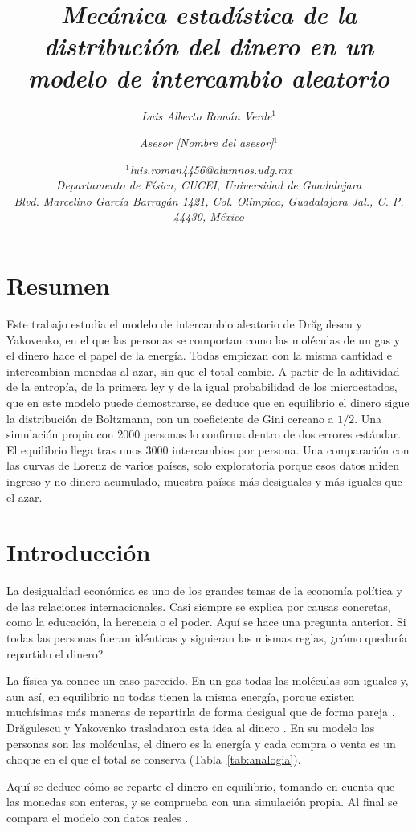 \documentclass[letterpaper,12pt]{article}
\title{\fontsize{0.5cm}{0.5cm}\selectfont
\textit{\textbf{Mecánica estadística de la distribución del dinero en un modelo de intercambio aleatorio}}
}
\author{ \fontsize{0.35cm}{0.5cm}\selectfont
\textit{Luis Alberto Román Verde$^1$} \\
        \and \fontsize{0.35cm}{0.5cm}\selectfont \textit{Asesor [Nombre del asesor]$^1$}
	}
\date{\small
  $^1$\fontsize{0.35cm}{0.5cm}\selectfont \textit{luis.roman4456@alumnos.udg.mx\\ Departamento de Física, CUCEI, Universidad de Guadalajara\\
    Blvd. Marcelino García Barragán 1421, Col. Olímpica, Guadalajara Jal., C. P. 44430, México}\\[2ex]
  }
\begin{document}
\maketitle
\thispagestyle{fancy}

\section*{Resumen}
Este trabajo estudia el modelo de intercambio aleatorio de Drăgulescu y Yakovenko, en el que las personas se comportan como las moléculas de un gas y el dinero hace el papel de la energía. Todas empiezan con la misma cantidad e intercambian monedas al azar, sin que el total cambie. A partir de la aditividad de la entropía, de la primera ley y de la igual probabilidad de los microestados, que en este modelo puede demostrarse, se deduce que en equilibrio el dinero sigue la distribución de Boltzmann, con un coeficiente de Gini cercano a $1/2$. Una simulación propia con 2000 personas lo confirma dentro de dos errores estándar. El equilibrio llega tras unos 3000 intercambios por persona. Una comparación con las curvas de Lorenz de varios países, solo exploratoria porque esos datos miden ingreso y no dinero acumulado, muestra países más desiguales y más iguales que el azar.

\section*{Introducción}
La desigualdad económica es uno de los grandes temas de la economía política y de las relaciones internacionales. Casi siempre se explica por causas concretas, como la educación, la herencia o el poder. Aquí se hace una pregunta anterior. Si todas las personas fueran idénticas y siguieran las mismas reglas, ¿cómo quedaría repartido el dinero?

La física ya conoce un caso parecido. En un gas todas las moléculas son iguales y, aun así, en equilibrio no todas tienen la misma energía, porque existen muchísimas más maneras de repartirla de forma desigual que de forma pareja \cite{reif}. Drăgulescu y Yakovenko trasladaron esta idea al dinero \cite{dy2000}. En su modelo las personas son las moléculas, el dinero es la energía y cada compra o venta es un choque en el que el total se conserva (Tabla~\ref{tab:analogia}).

Aquí se deduce cómo se reparte el dinero en equilibrio, tomando en cuenta que las monedas son enteras, y se comprueba con una simulación propia. Al final se compara el modelo con datos reales \cite{pip}.
\end{document}
